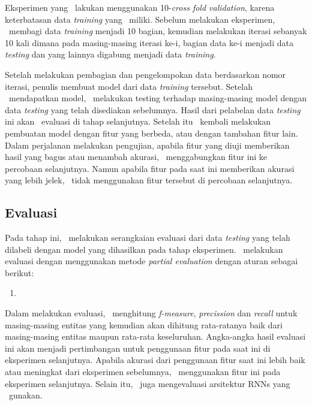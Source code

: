 	Eksperimen yang \saya~lakukan menggunakan 10-\textit{cross fold validation}, karena keterbatasan data \textit{training} yang \saya~miliki. Sebelum melakukan eksperimen, \saya~membagi data \textit{training} menjadi 10 bagian, kemudian melakukan iterasi sebanyak 10 kali dimana pada masing-masing iterasi ke-i, bagian data ke-i menjadi data \textit{testing} dan yang lainnya digabung menjadi data \textit{training}. 
	
	Setelah melakukan pembagian dan pengelompokan data berdasarkan nomor iterasi, penulis membuat model dari data \textit{training} tersebut. Setelah \saya~mendapatkan model, \saya~melakukan testing terhadap masing-masing model dengan data \textit{testing} yang telah disediakan sebelumnya. Hasil dari pelabelan data \textit{testing} ini akan \saya~evaluasi di tahap selanjutnya. Setelah itu \saya~kembali melakukan pembuatan model dengan fitur yang berbeda, atau dengan tambahan fitur lain. Dalam perjalanan melakukan pengujian, apabila fitur yang diuji memberikan hasil yang bagus atau menambah akurasi, \saya~menggabungkan fitur ini ke percobaan selanjutnya. Namun apabila fitur pada saat ini memberikan akurasi yang lebih jelek, \saya~tidak menggunakan fitur tersebut di percobaan selanjutnya.
	
	\subsection{Evaluasi}
	Pada tahap ini, \saya~melakukan serangkaian evaluasi dari data \textit{testing} yang telah dilabeli dengan model yang dihasilkan pada tahap eksperimen. \Saya~melakukan evaluasi dengan menggunakan metode \textit{partial evaluation} dengan aturan sebagai berikut:
	
	\begin{enumerate}
		\item 
	\end{enumerate}
	
	
	Dalam melakukan evaluasi, \saya~menghitung \textit{f-measure}, \textit{precission} dan \textit{recall} untuk masing-masing entitas yang kemudian akan dihitung rata-ratanya baik dari masing-masing entitas maupun rata-rata keseluruhan. Angka-angka hasil evaluasi ini akan menjadi pertimbangan untuk penggunaan fitur pada saat ini di eksperimen selanjutnya. Apabila akurasi dari penggunaan fitur saat ini lebih baik atau meningkat dari eksperimen sebelumnya, \saya~menggunakan fitur ini pada eksperimen selanjutnya. Selain itu, \saya~juga mengevaluasi arsitektur RNNs yang \saya~gunakan.
	